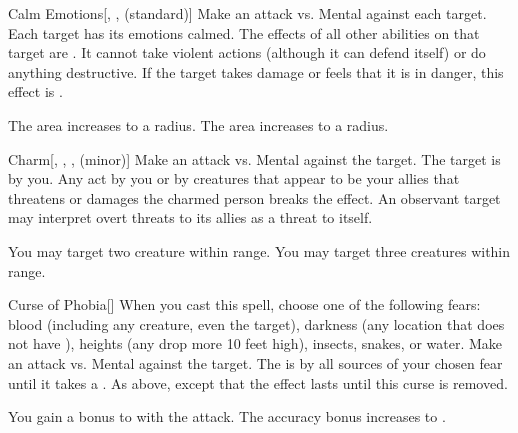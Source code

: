 \lowercase{\hypertarget{spell:Calm Emotions}{}}\label{spell:Calm Emotions}
\begin{freeability}[Rank 3]{\hypertarget{spell:Calm Emotions}{Calm Emotions}}[, ,  (standard)]
Make an attack vs. Mental against each target.
\hit Each target has its emotions calmed.
The effects of all other  abilities on that target are .
It cannot take violent actions (although it can defend itself) or do anything destructive.
If the target takes damage or feels that it is in danger, this effect is .

\rankline
{} The area increases to a \areahuge radius.
 The area increases to a \areaext radius.
\end{freeability}
\vspace{0.25em}



\lowercase{\hypertarget{spell:Charm}{}}\label{spell:Charm}
\begin{freeability}[Rank 3]{\hypertarget{spell:Charm}{Charm}}[, , ,  (minor)]
Make an attack vs. Mental against the target.
\hit The target is \charmed by you.
Any act by you or by creatures that appear to be your allies that threatens or damages the charmed person breaks the effect.
An observant target may interpret overt threats to its allies as a threat to itself.

\rankline
{} You may target two creature within range.
 You may target three creatures within range.
\end{freeability}
\vspace{0.25em}



\lowercase{\hypertarget{spell:Curse of Phobia}{}}\label{spell:Curse of Phobia}
\begin{freeability}[Rank 3]{\hypertarget{spell:Curse of Phobia}{Curse of Phobia}}[]
When you cast this spell, choose one of the following fears: blood (including any  creature, even the target), darkness (any location that does not have ), heights (any drop more 10 feet high), insects, snakes, or water.
Make an attack vs. Mental against the target.
\hit The is  by all sources of your chosen fear until it takes a .
\crit As above, except that the effect lasts until this curse is removed.

\rankline
{} You gain a  bonus to  with the attack.
 The accuracy bonus increases to .
\end{freeability}
\vspace{0.25em}



